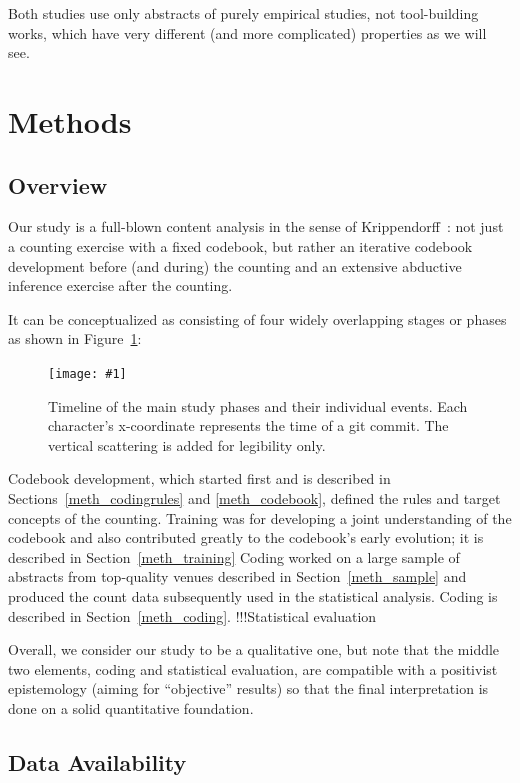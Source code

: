 \documentclass[10pt,journal,compsoc]{IEEEtran}
\newcommand{\Plot}[2]{%
	\begin{figure}[htb]%
		\centering\texttt{[image: \#1]}%
		\vspace{-4mm}\caption{#2}\label{#1}%
	\end{figure}}
\begin{document}
Both studies use only abstracts of purely empirical studies,
not tool-building works, 
which have very different (and more complicated) properties
as we will see.



\section{Methods}


\subsection{Overview}

Our study is a full-blown content analysis in the sense of Krippendorff~\cite{Krippendorff04}:
not just a counting exercise with a fixed codebook,
but rather an iterative codebook development before (and during) the counting
and an extensive abductive inference exercise after the counting.

It can be conceptualized as consisting of four widely overlapping stages or phases
as shown in Figure~\ref{qabstracts_timeline_commits}:
%
\Plot{qabstracts_timeline_commits}{%
	Timeline of the main study phases and their individual events.
    Each character's x-coordinate represents the time of a git commit.
    The vertical scattering is added for legibility only.}
%
Codebook development, which started first and is described in Sections~\ref{meth_codingrules}
and \ref{meth_codebook},
defined the rules and target concepts of the counting.
Training was for developing a joint understanding of the codebook and also contributed
greatly to the codebook's early evolution;
it is described in Section~\ref{meth_training}
Coding worked on a large sample of abstracts from top-quality venues described in
Section~\ref{meth_sample} and produced the count data subsequently used in the statistical analysis.
Coding is described in Section~\ref{meth_coding}.
!!!Statistical evaluation

Overall, we consider our study to be a qualitative one, but note that the middle two elements,
coding and statistical evaluation,
are compatible with a positivist epistemology (aiming for ``objective'' results) so that
the final interpretation is done on a solid quantitative foundation.


\subsection{Data Availability}\label{dataavailability}
\end{document}

